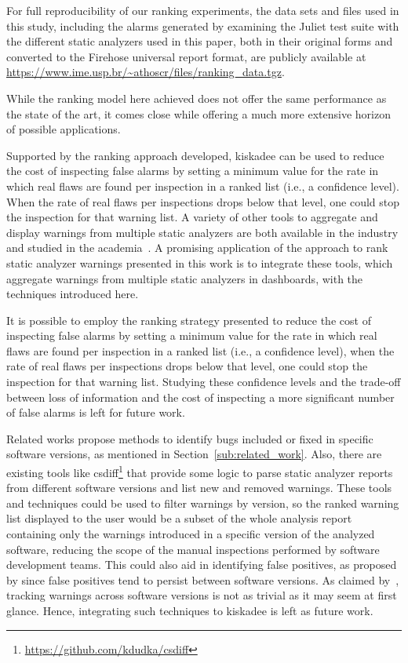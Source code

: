 For full reproducibility of our ranking experiments, the data sets and files
used in this study, including the alarms generated by examining the Juliet test
suite with the different static analyzers used in this paper, both in their
original forms and converted to the Firehose universal report format, are
publicly available at
\url{https://www.ime.usp.br/~athoscr/files/ranking_data.tgz}.

While the ranking model here achieved does not offer the same performance as
the state of the art, it comes close while offering a much more extensive horizon of
possible applications.

Supported by the ranking approach developed, kiskadee can be used to reduce the
cost of inspecting false alarms by setting a minimum value for the rate in
which real flaws are found per inspection in a ranked list (i.e., a confidence
level). When the rate of real flaws per inspections drops below that level, one
could stop the inspection for that warning list. A variety of other tools to
aggregate and display warnings from multiple static analyzers are both
available in the industry and studied in the academia~\citep{buckers2017uav,
heinemann2014teamscale}. A promising application of the approach to rank static
analyzer warnings presented in this work is to integrate these tools, which
aggregate warnings from multiple static analyzers in dashboards, with the
techniques introduced here. 

It is possible to employ the ranking strategy presented to reduce the cost of
inspecting false alarms by setting a minimum value for the rate in which real
flaws are found per inspection in a ranked list (i.e., a confidence level),
when the rate of real flaws per inspections drops below that level, one could
stop the inspection for that warning list. Studying these confidence levels and
the trade-off between loss of information and the cost of inspecting a more significant
number of false alarms is left for future work.

Related works propose methods to identify bugs included or fixed in specific
software versions, as mentioned in Section~\ref{sub:related_work}.  Also, there
are existing tools like csdiff\footnote{\url{https://github.com/kdudka/csdiff}}
that provide some logic to parse static analyzer reports from different
software versions and list new and removed warnings.  These tools and
techniques could be used to filter warnings by version, so the ranked warning
list displayed to the user would be a subset of the whole analysis report
containing only the warnings introduced in a specific version of the analyzed
software, reducing the scope of the manual inspections performed by software
development teams.  This could also aid in identifying false positives, as
proposed by \cite{kim_which_2007} since false positives tend to
persist between software versions. As claimed by~\cite{spacco_tracking_2006}, tracking warnings across software versions is
not as trivial as it may seem at first glance. Hence, integrating such techniques
to kiskadee is left as future work.

